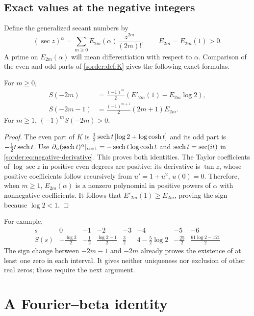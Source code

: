\subsection{Exact values at the negative integers}

Define the generalized secant numbers by
\[
 (\sec z)^\alpha=\sum_{m\ge0}E_{2m}(\alpha)\frac{z^{2m}}{(2m)!},
 \qquad E_{2m}=E_{2m}(1)>0.
\]
A prime on $E_{2m}(\alpha)$ will mean differentiation with respect
to $\alpha$. Comparison of the even and odd parts of \eqref{sorder:def:K}
gives the following exact formulas.
\begin{corollary}\label{sorder:cor:negative-values}
For $m\ge0$,
\begin{align}
 S(-2m)&=\frac{(-1)^m}{2}
       \left(E'_{2m}(1)-E_{2m}\log2\right),\label{sorder:eq:negative-even}\\
 S(-2m-1)&=\frac{(-1)^{m+1}}2(2m+1)E_{2m}.
 \label{sorder:eq:negative-odd}
\end{align}
For $m\ge1$, $(-1)^mS(-2m)>0$.
\end{corollary}
\begin{proof}
The even part of $K$ is
$\tfrac12\operatorname{sech} t\,[\log2+\log\cosh t]$ and its odd part is
$-\tfrac12t\operatorname{sech} t$. Use
$\partial_\alpha(\operatorname{sech} t)^\alpha|_{\alpha=1}
=-\operatorname{sech} t\log\cosh t$ and $\operatorname{sech} t=\sec(it)$ in
\eqref{sorder:eq:negative-derivative}. This proves both identities.
The Taylor coefficients of $\log\sec z$ in positive even degrees are
positive: its derivative is $\tan z$, whose positive coefficients
follow recursively from $u'=1+u^2$, $u(0)=0$.
Therefore, when $m\ge1$, $E_{2m}(\alpha)$ is a nonzero polynomial
in positive powers of $\alpha$ with nonnegative coefficients.
It follows that $E'_{2m}(1)\ge E_{2m}$, proving the sign because
$\log2<1$.
\end{proof}
For example,
\[
\begin{array}{c|rrrrrrr}
 s&0&-1&-2&-3&-4&-5&-6\\\hline
 S(s)&-\frac{\log2}{2}&-\frac12&\frac{\log2-1}{2}&\frac32&
 4-\frac52\log2&-\frac{25}2&\frac{61\log2-121}{2}
\end{array}
\]
The sign change between $-2m-1$ and $-2m$ already proves the existence
of at least one zero in each interval. It gives neither uniqueness nor
exclusion of other real zeros; those require the next argument.

\section{A Fourier--beta identity}

